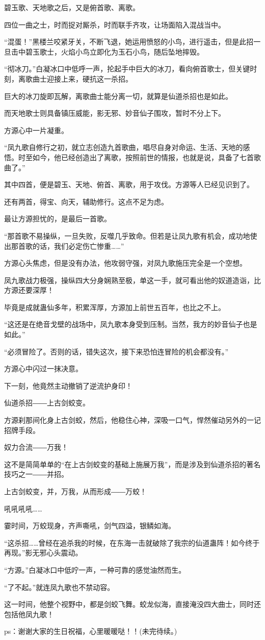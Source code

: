 \begin{this_body}
碧玉歌、天地歌之后，又是俯首歌、离歌。

四位一曲之士，时而捉对厮杀，时而联手齐攻，让场面陷入混战当中。

“混蛋！”黑楼兰咬紧牙关，不断飞退，她运用愤怒的小鸟，进行遥击，但是此招一旦击中碧玉歌士，火焰小鸟立即化为玉石小鸟，随后坠地摔毁。

“彻冰刀。”白凝冰口中低呼一声，抡起手中巨大的冰刀，看向俯首歌士，但关键时刻，离歌曲士迎接上来，硬抗这一杀招。

巨大的冰刀旋即瓦解，离歌曲士能分离一切，就算是仙道杀招也是如此。

而天地歌士则具备镇压威能，影无邪、妙音仙子围攻，暂时不分上下。

方源心中一片凝重。

“凤九歌自修行之初，就立志创造九首歌曲，唱尽自身对命运、生活、天地的感悟。时至如今，他已经创造出了离歌，按照前世的情报，也就是说，具备了七首歌曲了。”

其中四首，便是碧玉、天地、俯首、离歌，用于攻伐。方源等人已经见识到了。

还有两首，得宝、向天，辅助修行。这点不足为虑。

最让方源担忧的，是最后一首歌。

“那首歌不易操纵，一旦失败，反噬几乎致命。但若是让凤九歌有机会，成功地使出那首歌的话，我们必定伤亡惨重……”

方源心头焦虑，但是没有办法，他攻弱守强，对凤九歌施压完全是一个空想。

凤九歌战力极强，操纵四大分身娴熟至极，单这一手，就可看出他的奴道造诣，比方源还要深厚！

毕竟是成就蛊仙多年，积累浑厚，方源加上前世五百年，也比之不上。

“这还是在绝音戈壁的战场中，凤九歌本身受到压制。当然，我方的妙音仙子也是如此。”

“必须冒险了。否则的话，错失这次，接下来恐怕连冒险的机会都没有。”

方源心中闪过一抹决意。

下一刻，他竟然主动撤销了逆流护身印！

仙道杀招――上古剑蛟变。

方源刹那间化身上古剑蛟，然后，他稳住心神，深吸一口气，悍然催动另外的一记招牌手段。

奴力合流――万我！

这不是简简单单的“在上古剑蛟变的基础上施展万我”，而是涉及到仙道杀招的著名技巧之一――并招。

上古剑蛟变，并，万我，从而形成――万蛟！

吼吼吼吼……

霎时间，万蛟现身，齐声嘶吼，剑气四溢，银鳞如海。

“这杀招……曾经在追杀我的时候，在东海一击就破除了我宗的仙道蛊阵！如今终于再现。”影无邪心头震动。

“方源。”白凝冰口中低咛一声，一种可靠的感觉油然而生。

“了不起。”就连凤九歌也不禁动容。

这一时间，他整个视野中，都是剑蛟飞舞。蛟龙似海，直接淹没四大曲士，同时还包括他凤九歌！

ps：谢谢大家的生日祝福，心里暖暖哒！！(未完待续。)

\end{this_body}

